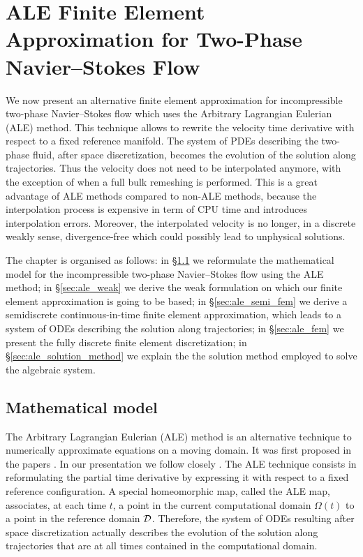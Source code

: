 \chapter[Two-Phase Navier--Stokes Flow ALE FEM]
{\sc ALE Finite Element Approximation for Two-Phase Navier--Stokes Flow}
\label{ch:ale}
We now present an alternative finite element approximation for incompressible
two-phase Navier--Stokes flow which uses the Arbitrary Lagrangian Eulerian (ALE)
method. This technique allows to rewrite the velocity time derivative with
respect to a fixed reference manifold. The system of PDEs describing the
two-phase fluid, after space discretization, becomes the evolution of the
solution along trajectories. Thus the velocity does not need to be interpolated
anymore, with the exception of when a full bulk remeshing is performed. This is
a great advantage of ALE methods compared to non-ALE methods, because the
interpolation process is expensive in term of CPU time and introduces
interpolation errors. Moreover, the interpolated velocity is no longer,
in a discrete weakly sense, divergence-free which could possibly lead 
to unphysical solutions. 

The chapter is organised as follows: in \S\ref{sec:ale_model} we reformulate the
mathematical model for the incompressible two-phase Navier--Stokes flow using
the ALE method; in \S\ref{sec:ale_weak} we derive the weak formulation on
which our finite element approximation is going to be based; in
\S\ref{sec:ale_semi_fem} we derive a semidiscrete continuous-in-time finite
element approximation, which leads to a system of ODEs describing the solution
along trajectories; in \S\ref{sec:ale_fem} we present the fully discrete finite
element discretization; in \S\ref{sec:ale_solution_method} we explain the
the solution method employed to solve the algebraic system.

\section{Mathematical model}\label{sec:ale_model}
The Arbitrary Lagrangian Eulerian (ALE) method is an alternative technique to
numerically approximate equations on a moving domain. It was first proposed in
the papers \cite{Donea83,Hughes81}. In our presentation we follow closely
\cite{Nobile99,Formaggia04,NobilePhd}. The ALE technique consists in
reformulating
the partial time derivative by expressing it with respect to a fixed reference
configuration. A special homeomorphic map, called the ALE map, associates, at
each time $t$, a point in the current computational domain $\Omega(t)$ to a
point in the reference domain $\mathcal D$. Therefore, the system of ODEs resulting
after space discretization actually describes the evolution of the solution
along trajectories that are at all times contained in the computational domain.

